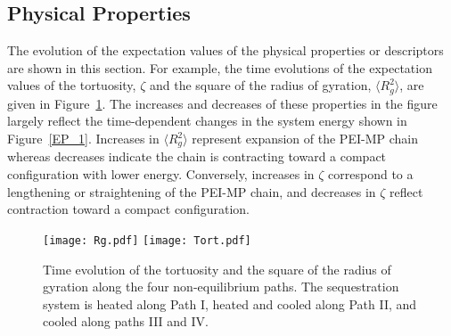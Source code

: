 \documentclass[
journal=jcisd8, %
manuscript=article,
layout=twocolumn   %
]{achemso}
\begin{document}
\subsection{Physical Properties}

The evolution of the expectation values of the physical properties or descriptors are shown in this section.  For example, the time evolutions of the expectation values of the tortuosity, $\zeta$ and the square of the radius of gyration, $\langle R_{g}^2 \rangle $, are given in Figure~\ref{Rg_t_1}. The increases and decreases of these properties in the figure largely reflect the time-dependent changes in the system energy shown in Figure~\ref{EP_1}. Increases in $\langle R_{g}^2 \rangle $ represent expansion of the PEI-MP chain whereas decreases indicate the chain is contracting toward a compact configuration with lower energy. Conversely, increases in $\zeta$ correspond to a lengthening or straightening of the PEI-MP chain, and decreases in $\zeta$ reflect contraction toward a compact configuration.
 \begin{figure}
 	\centering
 	\texttt{[image: Rg.pdf]}
 	\centering
 	\texttt{[image: Tort.pdf]}
 	\hspace*{\fill} 
 	\caption{Time evolution of the tortuosity and the square of the radius of gyration along the four non-equilibrium paths. The sequestration system is heated along Path I, heated and cooled along Path II, and cooled along paths III and IV.}
 	\label{Rg_t_1}
 	\hspace*{\fill} 
 \end{figure}
 
\end{document}
